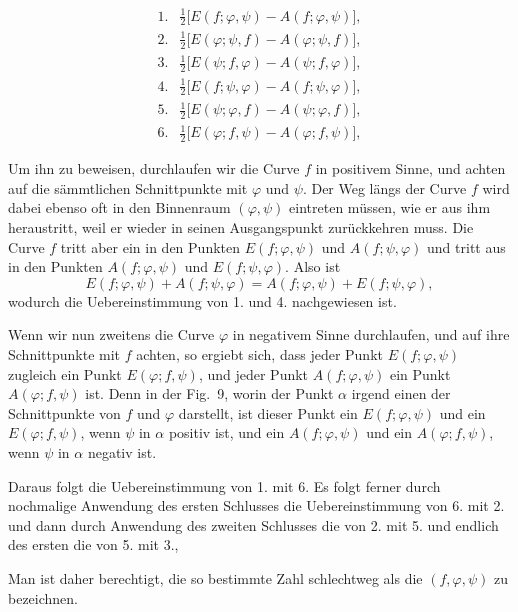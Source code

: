 \[
\begin{array}{ll}
1. & \tfrac{1}{2}\big[E(f; \varphi, \psi) - A(f; \varphi, \psi)\big], \\
2. & \tfrac{1}{2}\big[E(\varphi; \psi, f) - A(\varphi; \psi, f)\big], \\
3. & \tfrac{1}{2}\big[E(\psi; f, \varphi) - A(\psi; f, \varphi)\big], \\
4. & \tfrac{1}{2}\big[E(f; \psi, \varphi) - A(f; \psi, \varphi)\big], \\
5. & \tfrac{1}{2}\big[E(\psi; \varphi, f) - A(\psi; \varphi, f)\big], \\
6. & \tfrac{1}{2}\big[E(\varphi; f, \psi) - A(\varphi; f, \psi)\big],
\end{array}
\]

Um ihn zu beweisen, durchlaufen wir die Curve $f$ in positivem
Sinne, und achten auf die sämmtlichen Schnittpunkte mit $\varphi$
und $\psi$. Der Weg längs der Curve $f$ wird dabei ebenso oft in
den Binnenraum $(\varphi, \psi)$ eintreten müssen, wie er aus ihm heraustritt,
weil er wieder in seinen Ausgangspunkt zurückkehren
muss. Die Curve $f$ tritt aber ein in den Punkten $E(f; \varphi, \psi)$
und $A(f; \psi, \varphi)$ und tritt aus in den Punkten $A(f; \varphi, \psi)$ und
$E(f; \psi, \varphi)$. Also ist
\[
E(f; \varphi, \psi) + A(f; \psi, \varphi) = A(f; \varphi, \psi) + E(f; \psi, \varphi),
\]
wodurch die Uebereinstimmung von 1. und 4. nachgewiesen ist.


Wenn wir nun zweitens die Curve $\varphi$ in negativem Sinne
durchlaufen, und auf ihre Schnittpunkte mit $f$ achten, so ergiebt
sich, dass jeder Punkt $E(f; \varphi, \psi)$ zugleich ein Punkt $E(\varphi; f, \psi)$,
und jeder Punkt $A(f; \varphi, \psi)$ ein Punkt $A(\varphi; f, \psi)$ ist. Denn in
der Fig.~9, worin der Punkt $\alpha$ irgend einen der Schnittpunkte
von $f$ und $\varphi$ darstellt, ist dieser Punkt ein $E(f; \varphi, \psi)$ und
ein $E(\varphi; f, \psi)$, wenn $\psi$ in $\alpha$ positiv ist, und ein $A(f; \varphi, \psi)$ und
ein $A(\varphi; f, \psi)$, wenn $\psi$ in $\alpha$ negativ ist.

Daraus folgt die Uebereinstimmung von 1. mit 6. Es folgt
ferner durch nochmalige Anwendung des ersten Schlusses die
Uebereinstimmung von 6. mit 2. und dann durch Anwendung des
zweiten Schlusses die von 2. mit 5. und endlich des ersten die
von 5. mit 3., 

Man ist daher berechtigt, die so bestimmte Zahl schlechtweg
als die  $(f, \varphi, \psi)$ zu
bezeichnen.
